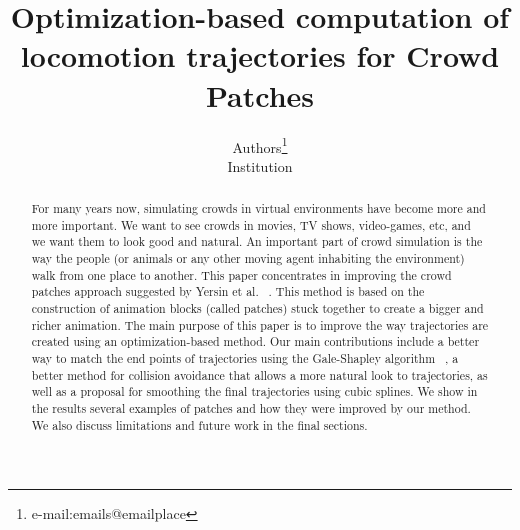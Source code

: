 \documentclass[review]{acmsiggraph}
\title{Optimization-based computation of locomotion trajectories for Crowd Patches}
\author{Authors\thanks{e-mail:emails@emailplace}\\Institution}
\begin{document}

\maketitle

\begin{abstract}

For many years now, simulating crowds in virtual environments have become more and more important. We want to see crowds in movies, TV shows, video-games, etc, and we want them to look good and natural.  An important part of crowd simulation is the way the people (or animals or any other moving agent inhabiting the environment) walk from one place to another. This paper concentrates in improving the crowd patches approach suggested by Yersin et al. ~\cite{Yersin:2009}. This method is based on the construction of animation blocks (called patches) stuck together to create a bigger and richer animation. The main purpose of this paper is to improve the way trajectories are created using an optimization-based method. Our main contributions include a better way to match the end points of trajectories using the Gale-Shapley algorithm~\cite{gale1962college} , a better method for collision avoidance that allows a more natural look to trajectories, as well as a proposal for smoothing the final trajectories using cubic splines. We show in the results several examples of patches and how they were improved by our method. We also discuss limitations and future work in the final sections.




\end{abstract}

\begin{CRcatlist}
\end{CRcatlist}
\end{document}
